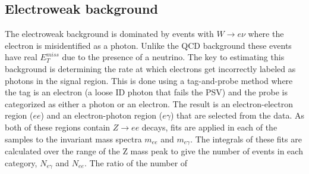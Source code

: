 \subsection{Electroweak background}
The electroweak background is dominated by events with $W \rightarrow e \nu$ where the electron is misidentified as a photon.  Unlike the QCD background these events have  real $E^{miss}_T$ due to the presence of a neutrino.  The key to estimating this background is determining the rate at which electrons get incorrectly labeled as photons in the signal region.  This is done using a tag-and-probe method where the tag is an electron (a loose ID photon that fails the PSV) and the probe is categorized as either a photon or an electron.  The result is an electron-electron region ($ee$) and an electron-photon region ($e\gamma$) that are selected from the data.    As both of these regions contain $Z\rightarrow ee$ decays, fits are applied in each of the samples to the invariant mass spectra $m_{ee}$ and $m_{e\gamma}$.  The integrals of these fits are calculated over the range of the Z mass peak to give the number of events in each category, $N_{e\gamma}$ and $N_{ee}$.  The ratio of the number of 





